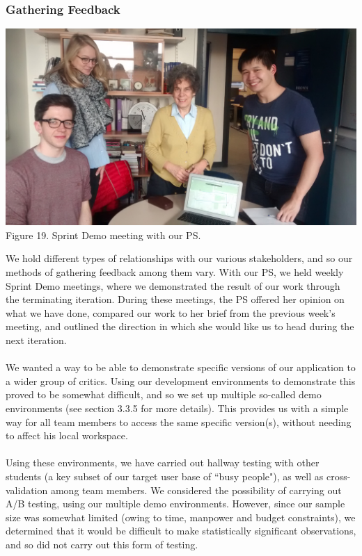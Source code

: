 \documentclass[a4paper, 10pt]{report}
\begin{document}
\subsubsection{Gathering Feedback}
\begin{center}
\includegraphics[scale=0.12]{sophia_1.png}\\
Figure 19. Sprint Demo meeting with our PS.
\end{center}
We hold different types of relationships with our various stakeholders, and so our methods of gathering feedback among them vary. With our PS, we held weekly Sprint Demo meetings, where we demonstrated the result of our work through the terminating iteration. During these meetings, the PS offered her opinion on what we have done, compared our work to her brief from the previous week's meeting, and outlined the direction in which she would like us to head during the next iteration. \\\\
We wanted a way to be able to demonstrate specific versions of our application to a wider group of critics. Using our development environments to demonstrate this proved to be somewhat difficult, and so we set up multiple so-called demo environments (see section 3.3.5 for more details). This provides us with a simple way for all team members to access the same specific version(s), without needing to affect his local workspace. \\\\
Using these environments, we have carried out hallway testing with other students (a key subset of our target user base of ``busy people"), as well as cross-validation among team members. We considered the possibility of carrying out A/B testing, using our multiple demo environments. However, since our sample size was somewhat limited (owing to time, manpower and budget constraints), we determined that it would be difficult to make statistically significant observations, and so did not carry out this form of testing. \\\\ 
\end{document}
